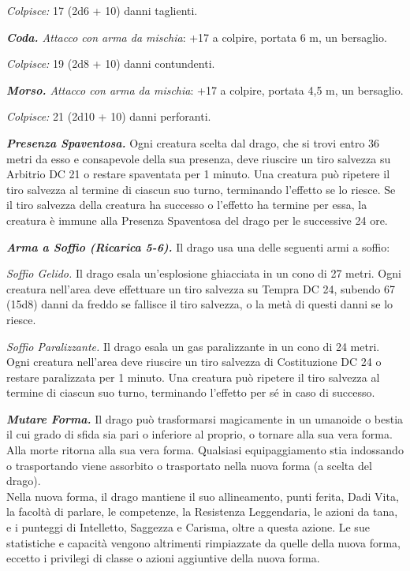 \begin{multicols}{2}
\emph{Colpisce:} 17 (2d6 + 10) danni taglienti.

\emph{\textbf{Coda.} Attacco con arma da mischia}: +17 a colpire,
portata 6 m, un bersaglio.

\emph{Colpisce:} 19 (2d8 + 10) danni contundenti.

\emph{\textbf{Morso.} Attacco con arma da mischia}: +17 a colpire,
portata 4,5 m, un bersaglio.

\emph{Colpisce:} 21 (2d10 + 10) danni perforanti.

\emph{\textbf{Presenza Spaventosa.}} Ogni creatura scelta dal drago, che
si trovi entro 36 metri da esso e consapevole della sua presenza, deve
riuscire un tiro salvezza su Arbitrio DC 21 o restare spaventata per 1
minuto. Una creatura può ripetere il tiro salvezza al termine di ciascun
suo turno, terminando l'effetto se lo riesce. Se il tiro salvezza della
creatura ha successo o l'effetto ha termine per essa, la creatura è
immune alla Presenza Spaventosa del drago per le successive 24 ore.

\emph{\textbf{Arma a Soffio (Ricarica 5-6).}} Il drago usa una delle
seguenti armi a soffio:

\emph{Soffio Gelido.} Il drago esala un'esplosione ghiacciata in un cono
di 27 metri. Ogni creatura nell'area deve effettuare un tiro salvezza su Tempra DC 24, subendo 67 (15d8) danni da freddo se fallisce il
tiro salvezza, o la metà di questi danni se lo riesce.

\emph{Soffio Paralizzante.} Il drago esala un gas paralizzante in un
cono di 24 metri. Ogni creatura nell'area deve riuscire un tiro salvezza
di Costituzione DC 24 o restare paralizzata per 1 minuto. Una creatura
può ripetere il tiro salvezza al termine di ciascun suo turno,
terminando l'effetto per sé in caso di successo.

\emph{\textbf{Mutare Forma.}} Il drago può trasformarsi magicamente in
un umanoide o bestia il cui grado di sfida sia pari o inferiore al proprio,  o tornare alla sua vera forma. Alla morte ritorna alla sua vera forma.  Qualsiasi equipaggiamento stia indossando o trasportando viene  assorbito o trasportato nella nuova forma (a scelta del drago).  \\
Nella nuova forma, il drago mantiene il suo allineamento, punti  ferita, Dadi Vita, la facoltà di parlare, le competenze, la Resistenza  Leggendaria, le azioni da tana, e i punteggi di Intelletto, Saggezza  e Carisma, oltre a questa azione. Le sue statistiche e capacità  vengono altrimenti rimpiazzate da quelle della nuova forma, eccetto i privilegi di classe o azioni aggiuntive della nuova forma.


\end{multicols}
